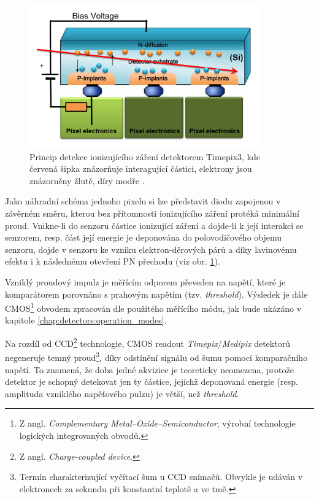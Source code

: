 \begin{figure}[th]
	\begin{center}
		\includegraphics[width=10cm]{figures/det_recombination.png}
		\caption{Princip detekce ionizujícího záření detektorem Timepix3, kde červená šipka znázorňuje interagující částici, elektrony jsou znázorněny žlutě, díry modře \cite{PlatkevicDisertace}.}
		\label{fig:det:recombination}
	\end{center}
\end{figure}

Jako náhradní schéma jednoho pixelu si lze představit diodu zapojenou v závěrném směru, kterou bez přítomnosti ionizujícího záření protéká minimální proud. Vnikne-li do senzoru částice ionizující záření a dojde-li k její interakci se senzorem, resp. část její energie je deponována do polovodičového objemu senzoru, dojde v senzoru ke vzniku elektron-děrových párů a díky lavinovému efektu i k následnému otevření PN přechodu (viz obr. \ref{fig:det:recombination}).

Vzniklý proudový impulz je měřícím odporem převeden na napětí, které je komparátorem porovnáno s prahovým napětím (tzv. \textit{threshold}). Výsledek je dále CMOS\footnote{Z angl. \textit{Complementary Metal–Oxide–Semiconductor}, výrobní technologie logických integrovaných obvodů.} obvodem zpracován dle použitého měřícího módu, jak bude ukázáno v kapitole \ref{chap:detectors:operation_modes}.

Na rozdíl od CCD\footnote{Z angl. \textit{Charge-coupled device}.} technologie, CMOS readout \textit{Timepix}/\textit{Medipix} detektorů negeneruje temný proud\footnote{Termín charakterizující vyčítací šum u CCD snímačů. Obvykle je udáván v elektronech za sekundu při konstantní teplotě a ve tmě.}, díky odstínění signálu od šumu pomocí komparačního napětí. To znamená, že doba jedné akvizice je teoreticky neomezena, protože detektor je schopný detekovat jen ty částice, jejíchž deponovaná energie (resp. amplituda vzniklého napěťového pulzu) je větší, než \textit{threshold}.

